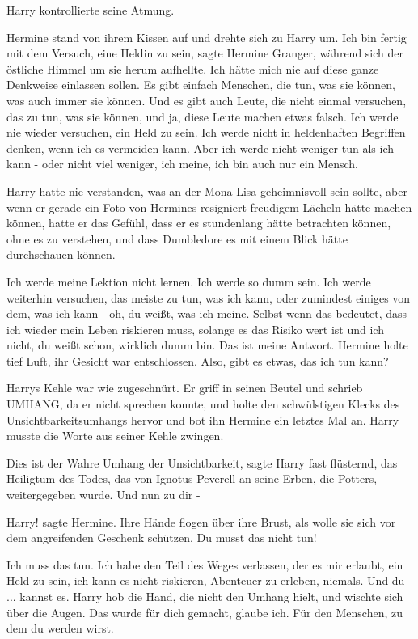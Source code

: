 Harry kontrollierte seine Atmung.

Hermine stand von ihrem Kissen auf und drehte sich zu Harry um. \glqq{}Ich bin
fertig mit dem Versuch, eine Heldin zu sein\grqq{}, sagte Hermine Granger,
während sich der östliche Himmel um sie herum aufhellte. \glqq{}Ich hätte mich
nie auf diese ganze Denkweise einlassen sollen. Es gibt einfach Menschen, die
tun, was sie können, was auch immer sie können. Und es gibt auch Leute, die
nicht einmal versuchen, das zu tun, was sie können, und ja, diese Leute machen
etwas falsch. Ich werde nie wieder versuchen, ein Held zu sein. Ich werde nicht
in heldenhaften Begriffen denken, wenn ich es vermeiden kann. Aber ich werde
nicht weniger tun als ich kann - oder nicht viel weniger, ich meine, ich bin
auch nur ein Mensch.\grqq{}

Harry hatte nie verstanden, was an der Mona Lisa geheimnisvoll sein sollte, aber
wenn er gerade ein Foto von Hermines resigniert-freudigem Lächeln hätte machen
können, hatte er das Gefühl, dass er es stundenlang hätte betrachten können,
ohne es zu verstehen, und dass Dumbledore es mit einem Blick hätte durchschauen
können.

\glqq{}Ich werde meine Lektion nicht lernen. Ich werde so dumm sein. Ich werde
weiterhin versuchen, das meiste zu tun, was ich kann, oder zumindest einiges von
dem, was ich kann - oh, du weißt, was ich meine. Selbst wenn das bedeutet, dass
ich wieder mein Leben riskieren muss, solange es das Risiko wert ist und ich
nicht, du weißt schon, wirklich dumm bin. Das ist meine Antwort.\grqq{} Hermine holte
tief Luft, ihr Gesicht war entschlossen. \glqq{}Also, gibt es etwas, das ich tun
kann?\grqq{}

Harrys Kehle war wie zugeschnürt. Er griff in seinen Beutel und schrieb UMHANG,
da er nicht sprechen konnte, und holte den schwülstigen Klecks des
Unsichtbarkeitsumhangs hervor und bot ihn Hermine ein letztes Mal an. Harry
musste die Worte aus seiner Kehle zwingen.

\glqq{}Dies ist der Wahre Umhang der Unsichtbarkeit\grqq{}, sagte Harry fast
flüsternd, \glqq{}das Heiligtum des Todes, das von Ignotus Peverell an seine
Erben, die Potters, weitergegeben wurde. Und nun zu dir -\grqq{}

\glqq{}Harry!\grqq{} sagte Hermine. Ihre Hände flogen über ihre Brust, als wolle
sie sich vor dem angreifenden Geschenk schützen. \glqq{}Du musst das nicht tun!\grqq{}

\glqq{}Ich muss das tun. Ich habe den Teil des Weges verlassen, der es mir
erlaubt, ein Held zu sein, ich kann es nicht riskieren, Abenteuer zu erleben,
niemals. Und du ... kannst es.\grqq{} Harry hob die Hand, die nicht den Umhang
hielt, und wischte sich über die Augen. \glqq{}Das wurde für dich gemacht, glaube
ich. Für den Menschen, zu dem du werden wirst.\grqq{}

